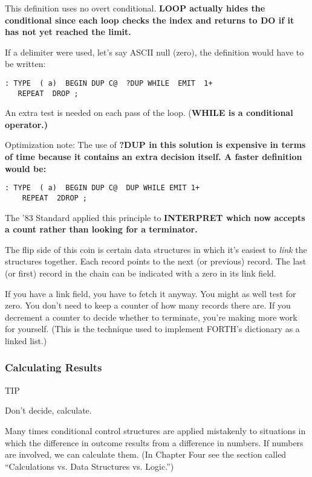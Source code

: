 This definition uses no overt conditional. \bf{LOOP} actually hides the
conditional since each loop checks the index and returns to \bf{DO} if it
has not yet reached the limit.

If a delimiter were used, let's say ASCII null (zero), the definition
would have to be written:

\begin{verbatim}
: TYPE  ( a)  BEGIN DUP C@  ?DUP WHILE  EMIT  1+
   REPEAT  DROP ;
\end{verbatim}

An extra test is needed on each pass of the loop. (\bf{WHILE} is a conditional
operator.)

Optimization note: The use of \bf{?DUP} in this solution is expensive in
terms of time because it contains an extra decision itself. A faster
definition would be:

\begin{verbatim}
: TYPE  ( a)  BEGIN DUP C@  DUP WHILE EMIT 1+
    REPEAT  2DROP ;
\end{verbatim}

The '83 Standard applied this principle to \bf{INTERPRET} which now accepts
a count rather than looking for a terminator.

The flip side of this coin is certain data structures in which it's
easiest to \emph{link} the structures together. Each record points to the next
(or previous) record. The last (or first) record in the chain can be indicated
with a zero in its link field.

If you have a link field, you have to fetch it anyway. You might as
well test for zero. You don't need to keep a counter of how many records
there are. If you decrement a counter to decide whether to terminate,
you're making more work for yourself. (This is the technique used to
implement FORTH's dictionary as a linked list.)

\subsubsection{Calculating Results}

TIP

Don't decide, calculate.

Many times conditional control structures are applied mistakenly to
situations in which the difference in outcome results from a difference in
numbers. If numbers are involved, we can calculate them. (In Chapter
Four see the section called ``Calculations vs. Data Structures vs. Logic.'')

